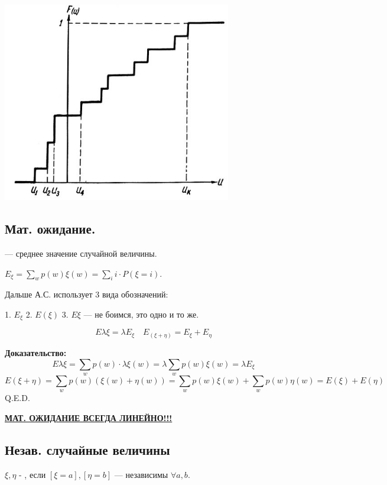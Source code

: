 \begin{center}
    \includegraphics[width = 10cm]{assets/2_1_1.jpg}
\end{center}

\subsection{Мат. ожидание.}
 --- среднее значение случайной величины. 

$E_{\xi} =\sum\limits_{w}p(w) \xi(w)=\sum\limits_{i}i\cdot P(\xi=i)$.

Дальше А.С. использует 3 вида обозначений:

1. $E_{\xi}$ 2. $E(\xi)$  3. $E \xi$ --- не боимся, это одно и то же.



$$E \lambda\xi = \lambda E_{\xi}\quad E_{(\xi + \eta)} = E_{\xi} + E_{\eta}$$


\textbf{Доказательство:}
$$E\lambda\xi = \sum\limits_{w}p(w) \cdot \lambda \xi(w) = \lambda \sum\limits_{w}p(w)  \xi(w)=\lambda E_{\xi}$$
$$E(\xi+\eta) = \sum\limits_{w}p(w) (\xi(w) + \eta(w))  = \sum\limits_{w}p(w) \xi(w) +\sum\limits_{w} p(w)\eta(w) = E(\xi) +E(\eta) $$
\hfill Q.E.D.

\textbf{\uline{МАТ. ОЖИДАНИЕ ВСЕГДА ЛИНЕЙНО!!!}}

\subsection{Незав. случайные величины} 

$\xi,\eta$ - , если $[\xi = a], [\eta = b]$ --- независимы $\forall a,b$.

